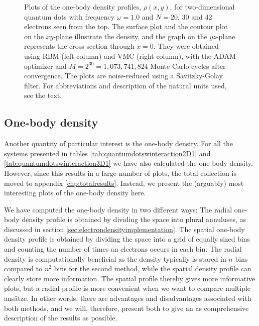 \begin{figure}
	\caption{Plots of the one-body density profiles, $\rho(x,y)$, for two-dimensional quantum dots with frequency $\omega=1.0$ and $N=20$, 30 and 42 electrons seen from the top. The surface plot and the contour plot on the $xy$-plane illustrate the density, and the graph on the $yz$-plane represents the cross-section through $x=0$. They were obtained using RBM (left column) and VMC (right column), with the ADAM optimizer and $M=2^{30}=1,073,741,824$ Monte Carlo cycles after convergence. The plots are noise-reduced using a Savitzky-Golay filter. For abbreviations and description of the natural units used, see the text.}
	\label{fig:OB_interaction_1p0w2}
\end{figure}

\subsection{One-body density} \label{sec:onebodyresults}
Another quantity of particular interest is the one-body density. For all the systems presented in tables \eqref{tab:quantumdotswinteraction2D1} and \eqref{tab:quantumdotswinteraction3D1} we have also calculated the one-body density. However, since this results in a large number of plots, the total collection is moved to appendix \ref{chp:totalresults}. Instead, we present the (arguably) most interesting plots of the one-body density here. 

We have computed the one-body density in two different ways: The radial one-body density profile is obtained by dividing the space into plural annuluses, as discussed in section \ref{sec:electrondensityimplementation}. The spatial one-body density profile is obtained by dividing the space into a grid of equally sized bins and counting the number of times an electrons occurs in each bin. The radial density is computationally beneficial as the density typically is stored in $n$ bins compared to $n^2$ bins for the second method, while the spatial density profile can clearly store more information. The spatial profile thereby gives more informative plots, but a radial profile is more convenient when we want to compare multiple ansätze. In other words, there are advantages and disadvantages associated with both methods, and we will, therefore, present both to give an as comprehensive description of the results as possible. 

